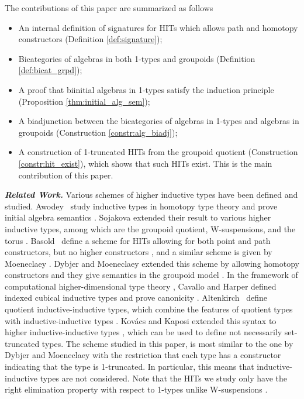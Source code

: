 The contributions of this paper are summarized as follows
\begin{itemize}
	\item An internal definition of signatures for HITs which allows path and homotopy constructors (Definition \ref{def:signature});
	\item Bicategories of algebras in both 1-types and groupoids (Definition \ref{def:bicat_grpd});
	\item A proof that biinitial algebras in 1-types satisfy the induction principle (Proposition \ref{thm:initial_alg_sem});
	\item A biadjunction between the bicategories of algebras in 1-types and algebras in groupoids (Construction \ref{constr:alg_biadj});
	\item A construction of 1-truncated HITs from the groupoid quotient (Construction \ref{constr:hit_exist}),
	which shows that such HITs exist.
	This is the main contribution of this paper.
\end{itemize}
\emph{\textbf{Related Work.}}
Various schemes of higher inductive types have been defined and studied.
Awodey \etal \ study inductive types in homotopy type theory and prove initial
algebra semantics \cite{AwodeyGS12}.
Sojakova extended their result to various higher inductive types, among which
are the groupoid quotient, W-suspensions, and the torus \cite{Sojakova15,sojakovaPhD}.
Basold \etal \ define a scheme for HITs allowing for both point and path constructors,
but no higher constructors \cite{BasoldGW17}, and a similar scheme is given by
Moeneclaey \cite{moeneclaey2016schema}. 
Dybjer and Moeneclaey extended this scheme by allowing homotopy constructors and
they give semantics in the groupoid model \cite{DBLP:journals/entcs/DybjerM18}.
In the framework of computational higher-dimensional type theory \cite{AngiuliHW17},
Cavallo and Harper defined indexed cubical inductive types and prove canonicity \cite{CavalloH19}.
Altenkirch \etal \ define quotient inductive-inductive types, which combine the features
of quotient types with inductive-inductive types \cite{forsberg2010inductive,AltenkirchCDKF18}.
Kov\'acs and Kaposi extended this syntax to higher inductive-inductive types \cite{KaposiK18},
which can be used to define not necessarily set-truncated types.
The scheme studied in this paper, is most similar to the one by Dybjer and Moeneclaey \cite{DBLP:journals/entcs/DybjerM18}
with the restriction that each type has a constructor indicating that the type is 1-truncated.
In particular, this means that inductive-inductive types are not considered.
Note that the HITs we study only have the right elimination property with respect to 1-types
unlike W-suspensions \cite{Sojakova15,sojakovaPhD}.

